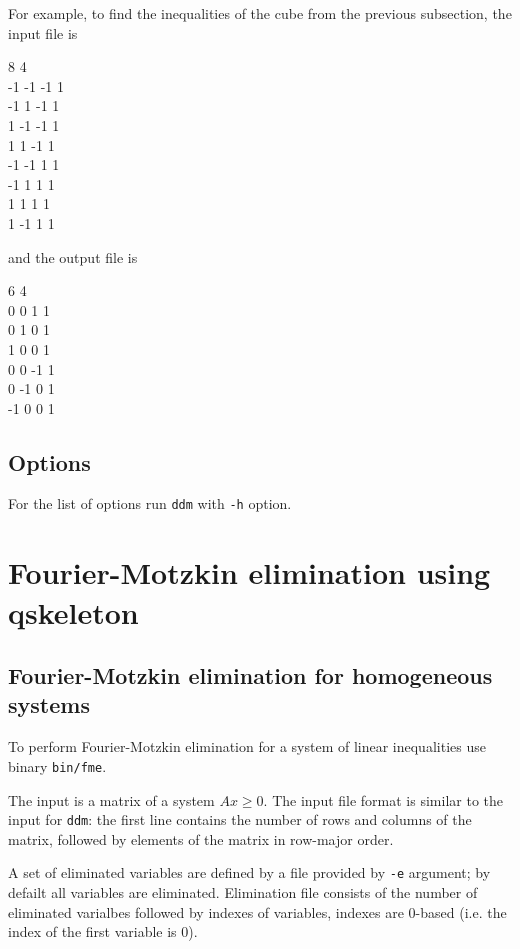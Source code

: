 \documentclass{article}
\begin{document}
For example, to find the inequalities of the cube from the previous subsection, the input file is
\begin{adjustwidth}{5cm}{0pt}
8 4 \\
-1 -1 -1 1 \\
-1 1 -1 1 \\
1 -1 -1 1 \\
1 1 -1 1 \\
-1 -1 1 1 \\
-1 1 1 1 \\
1 1 1 1 \\
1 -1 1 1
\end{adjustwidth}
and the output file is
\begin{adjustwidth}{5cm}{0pt}
6 4 \\
0 0 1 1 \\
0 1 0 1 \\
1 0 0 1 \\
0 0 -1 1 \\
0 -1 0 1 \\
-1 0 0 1
\end{adjustwidth}

\subsection{Options}\label{sec_DDMOptions}

For the list of options run \verb$ddm$ with \verb$-h$ option.


\section{Fourier-Motzkin elimination using qskeleton}

\subsection{Fourier-Motzkin elimination for homogeneous systems}

To perform Fourier-Motzkin elimination for a system of linear inequalities use binary \verb$bin/fme$.

The input is a matrix of a system $Ax \geq 0$. The input file format is similar to the input for \verb$ddm$: the first line contains the number of rows and columns of the matrix, followed by elements of the matrix in row-major order.

A set of eliminated variables are defined by a file provided by \verb$-e$ argument; by defailt all variables are eliminated. Elimination file consists of the number of eliminated varialbes followed by indexes of variables, indexes are 0-based (i.e. the index of the first variable is 0).
\end{document}
